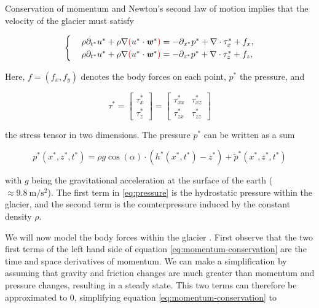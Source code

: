 Conservation of momentum and Newton's second law of motion implies that the velocity of the glacier must satisfy

\begin{equation} \label{eq:momentum-conservation}
  \begin{cases}
    &\rho \partial_{t^*} u^* + \rho \nabla \textcolor{red}{(}u^* \cdot \boldsymbol{\mathit{w}}^*\textcolor{red}{)} = -\partial_{x^*} p^* + \nabla \cdot \tau_x^* + f_x, \\
    &\rho \partial_{t^*} u^* + \rho \nabla \textcolor{red}{(} u^* \cdot \boldsymbol{\mathit{w}}^*\textcolor{red}{)} = -\partial_{z^*} p^* + \nabla \cdot \tau_z^* + f_z,
  \end{cases}
\end{equation}


Here, $f = (f_x, f_y)$ denotes the body forces on each point, $p^*$ the pressure, and

\begin{equation}
  \tau^* = \begin{bmatrix} \tau_x^* \\ \tau_z^* \end{bmatrix} = \begin{bmatrix} \tau_{xx}^* & \tau_{xz}^* \\ \tau_{zx}^* & \tau_{zz}^* \end{bmatrix}
\end{equation}

the stress tensor in two dimensions. The pressure $p^*$ can be written as a sum

\begin{equation} \label{eq:pressure}
  p^*(x^*, z^*, t^*) = \rho g \cos(\alpha) \cdot (h^*(x^*, t^*) - z^*) + \tilde{p}^*(x^*, z^*, t^*)
\end{equation}

with $g$ being the gravitational acceleration at the surface of the earth ($\approx \SI{9.8}{\meter\per\square\second}$). The first term in \eqref{eq:pressure} is the hydrostatic pressure within the glacier, and the second term is the counterpressure induced by the constant density $\rho$.

We will now model the body forces within the glacier . First observe that the two first terms of the left hand side of equation \eqref{eq:momentum-conservation} are the time and space derivatives of momentum.
We can make a simplification by assuming that gravity and friction changes are much greater than momentum and pressure changes, resulting in a steady state. This two terms can therefore be approximated to $0$, simplifying equation \eqref{eq:momentum-conservation} to 

